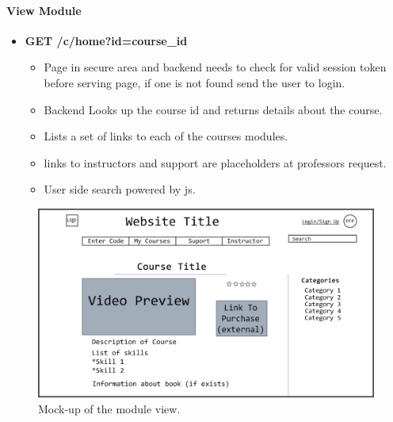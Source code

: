 \documentclass{article}
\begin{document}
\paragraph{View Module}
\vspace{\baselineskip}
\begin{itemize}
    \item \textbf{GET /c/home?id=course\_id}
        \begin{itemize}
        \item Page in secure area and backend needs to check for valid session
            token before serving page, if one is not found send the user to
                login.
        \item Backend Looks up the course id and returns details about the course.
        \item Lists a set of links to each of the courses modules.
        \item links to instructors and support are placeholders at professors request.
        \item User side search powered by js.
    \end{itemize}
\end{itemize}
\begin{figure}[h!]
    \caption{Mock-up of the module view.}
    \includegraphics[width=\textwidth]{course_preview}
\end{figure}

\newpage
\end{document}
